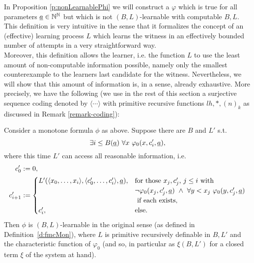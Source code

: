 In Proposition \ref{p:nonLearnablePhi} 
we will construct a $\varphi$ which is true 
for all parameters $\underline{a}\in\mathbb{N}^{\mathbb{N}}$ 
but which is not $(B,L)$-learnable with 
computable $B,L.$ \\[1mm] 
This definition is very intuitive in the sense that it formalizes the concept of an (effective) learning process $L$ which learns the witness in an effectively bounded number of attempts in a very straightforward way.\\
Moreover, this definition allows the learner, i.e. the function $L$ to use the least amount of non-computable information possible, namely only the smallest counterexample to the learners last candidate for the witness. 
Nevertheless, we will show that this amount of information is, in a sense, 
already exhaustive. More precisely, we have the following (we use in the 
rest of this section a surjective sequence coding 
denoted by $\langle\cdots\rangle$ with primitive recursive functions 
$lh,*,(n)_k$ as discussed in Remark \ref{remark-coding}):
\begin{prop}\label{p:allx}
Consider a monotone formula $\phi$ as above. Suppose there are $B$ and $L'$ s.t.
\[ \exists i\leq B(\tup a)\ \forall x\ \phi_0(x,c'_i,\tup a),\] where this 
time $L'$ can access all reasonable information, i.e.
\begin{align*}
c'_0&:=0,\\
c'_{i+1}&:=
\begin{cases}
L'(\langle x_0,\ldots,x_i\rangle, \langle c'_0,\ldots,c'_i\rangle,\tup a), &\text{for those $x_j,c'_j$, $j\leq i$ with }\\
 &\neg\phi_0(x_j,c'_j,\tup a)\ \wedge\ \forall y<x_j\ \phi_0(y,c'_j,\tup a)\\
  &\text{ if each exists},\\
c'_i, &\Telse.
\end{cases}
\end{align*}
Then $\phi$ is $(B,L)$-learnable in the original sense (as defined in Definition~\ref{d:fmcMon}), where $L$ is primitive recursively definable in $B,L'$ and 
the characteristic function of $\varphi_0$ (and so, in particular as 
$\xi(B,L')$ for a closed term $\xi$ of the system at hand).
\end{prop}
